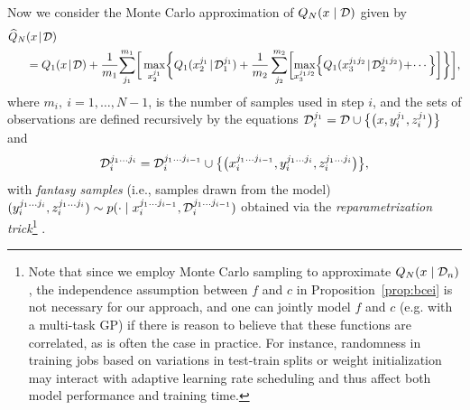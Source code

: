Now we consider the Monte Carlo approximation of $Q_{N}(x\mid\mathcal{D})$ given by
\begin{align*}
\widehat{Q}_{N}&(x\!\mid\!\D)\\
&= Q_1(x\!\mid\!\D) +  \frac{1}{m_1}\!\sum_{j_1}^{m_1}\!\bigg[\max_{x_2^{j_1}}\biggl\{Q_1(x_2^{j_1}\!\mid\! \D_1^{j_1}) +
 \frac{1}{m_2}\sum_{j_2}^{m_2}\biggl[\max_{x_3^{j_1 j_2}}\Bigl\{Q_1(x_3^{j_1 j_2}\!\mid\!\D_2^{j_1 j_2})\!+ \!\cdots\Bigr\}\biggr]\biggr\}\biggr],
\end{align*}
where $m_i, \ i = 1, \ldots, N-1$, is the number of samples used in step $i$, and the sets of observations are defined recursively by the equations $\mathcal{D}_i^{j_1} = \mathcal{D} \cup \bigl\{\bigl(x, y_i^{j_1}, z_i^{j_1}\bigr)\bigr\}$ and
\begin{equation*}
   \mathcal{D}_i^{j_1 \ldots j_i} = \mathcal{D}_i^{j_1 \ldots j_{i-1}} \cup \bigl\{\bigl(x_i^{j_1 \ldots j_{i-1}}, y_i^{j_1 \ldots j_i}, z_i^{j_1 \ldots j_i}\bigr)\bigr\}, 
\end{equation*}
with \textit{fantasy samples} (i.e., samples drawn from the model) $(y_i^{j_1 \ldots j_i}, z_i^{j_1 \ldots j_i}) \sim   p(\cdot \mid x_i^{j_1 \ldots j_{i-1}},  \mathcal{D}_i^{j_1 \ldots j_{i-1}})$
obtained via the \textit{reparametrization trick}\footnote{Note that since we employ Monte Carlo sampling to approximate $Q_N(x\mid \mathcal{D}_n)$, the independence assumption between $f$ and $c$ in Proposition~\ref{prop:bcei} is not necessary for our approach, and one can jointly model $f$ and $c$ (e.g. with a multi-task GP) if there is reason to believe that these functions are correlated, as is often the case in practice. For instance, randomness in training jobs based on variations in test-train splits or weight initialization may interact with adaptive learning rate scheduling and thus affect both model performance and training time.} \citep{kingma2013auto,wilson2018maximizing}. 


